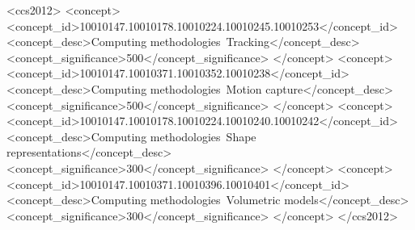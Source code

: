 %
%
\begin{CCSXML}
<ccs2012>
<concept>
<concept_id>10010147.10010178.10010224.10010245.10010253</concept_id>
<concept_desc>Computing methodologies~Tracking</concept_desc>
<concept_significance>500</concept_significance>
</concept>
<concept>
<concept_id>10010147.10010371.10010352.10010238</concept_id>
<concept_desc>Computing methodologies~Motion capture</concept_desc>
<concept_significance>500</concept_significance>
</concept>
<concept>
<concept_id>10010147.10010178.10010224.10010240.10010242</concept_id>
<concept_desc>Computing methodologies~Shape representations</concept_desc>
<concept_significance>300</concept_significance>
</concept>
<concept>
<concept_id>10010147.10010371.10010396.10010401</concept_id>
<concept_desc>Computing methodologies~Volumetric models</concept_desc>
<concept_significance>300</concept_significance>
</concept>
</ccs2012>
\end{CCSXML}


%
%


\keywordlist

\conceptlist

\printcopyright